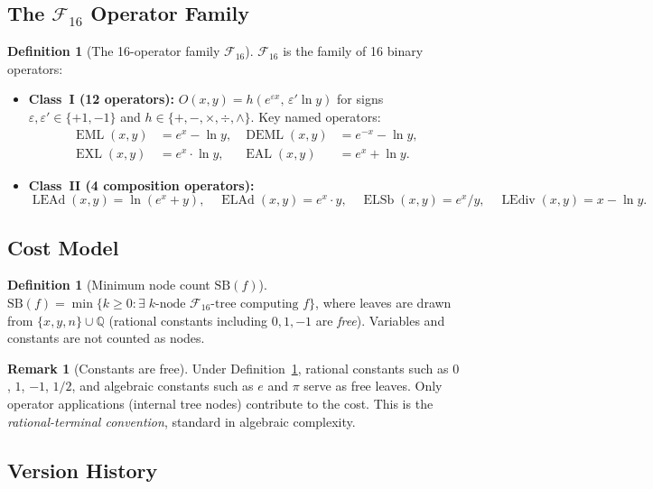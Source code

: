 \documentclass[12pt,a4paper]{article}
\theoremstyle{definition}
\newtheorem{definition}[theorem]{Definition}
\newtheorem{remark}[theorem]{Remark}
\newcommand{\EML}{\operatorname{EML}}
\newcommand{\EXL}{\operatorname{EXL}}
\newcommand{\EAL}{\operatorname{EAL}}
\newcommand{\DEML}{\operatorname{DEML}}
\newcommand{\ELAd}{\operatorname{ELAd}}
\newcommand{\ELSb}{\operatorname{ELSb}}
\newcommand{\LEAd}{\operatorname{LEAd}}
\newcommand{\LEdiv}{\operatorname{LEdiv}}
\newcommand{\SB}{\mathrm{SB}}
\newcommand{\F}{\mathcal{F}_{16}}
\begin{document}
\subsection{The \texorpdfstring{$\mathcal{F}_{16}$}{F16} Operator Family}

\begin{definition}[The 16-operator family $\F$]
\label{def:F16}
$\F$ is the family of 16 binary operators:
\begin{itemize}
  \item \textbf{Class~I (12 operators):} $O(x,y) = h(e^{\varepsilon x},\,\varepsilon'\ln y)$
    for signs $\varepsilon,\varepsilon'\in\{+1,-1\}$ and
    $h\in\{+,-,\times,\div,\wedge\}$.
    Key named operators:
    \begin{align*}
      \EML(x,y)  &= e^x - \ln y, &
      \DEML(x,y) &= e^{-x} - \ln y, \\
      \EXL(x,y)  &= e^x \cdot \ln y, &
      \EAL(x,y)  &= e^x + \ln y.
    \end{align*}
  \item \textbf{Class~II (4 composition operators):}
    \[
      \LEAd(x,y) = \ln(e^x + y), \quad
      \ELAd(x,y) = e^x \cdot y, \quad
      \ELSb(x,y) = e^x / y, \quad
      \LEdiv(x,y) = x - \ln y.
    \]
\end{itemize}
\end{definition}

\subsection{Cost Model}

\begin{definition}[Minimum node count $\SB(f)$]
\label{def:SB}
$\SB(f) = \min\{k \ge 0 : \exists\;\text{$k$-node $\F$-tree computing $f$}\}$,
where leaves are drawn from $\{x, y, n\} \cup \mathbb{Q}$
(rational constants including $0, 1, -1$ are \emph{free}).
Variables and constants are not counted as nodes.
\end{definition}

\begin{remark}[Constants are free]
Under Definition~\ref{def:SB}, rational constants such as $0$, $1$, $-1$, $1/2$,
and algebraic constants such as $e$ and $\pi$ serve as free leaves.
Only operator applications (internal tree nodes) contribute to the cost.
This is the \emph{rational-terminal convention}, standard in algebraic complexity.
\end{remark}

\subsection{Version History}
\end{document}
